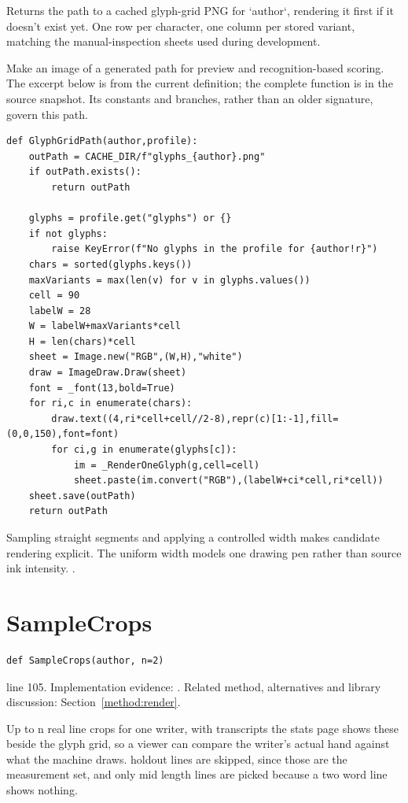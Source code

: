 Returns the path to a cached glyph-grid PNG for `author`, rendering it first if it doesn't exist yet. One row per character, one column per stored variant, matching the manual-inspection sheets used during development.


Make an image of a generated path for preview and recognition-based scoring. The excerpt below is from the current definition; the complete function is in the source snapshot. Its constants and branches, rather than an older signature, govern this path.


\begin{lstlisting}[style=plain]
def GlyphGridPath(author,profile):
    outPath = CACHE_DIR/f"glyphs_{author}.png"
    if outPath.exists():
        return outPath

    glyphs = profile.get("glyphs") or {}
    if not glyphs:
        raise KeyError(f"No glyphs in the profile for {author!r}")
    chars = sorted(glyphs.keys())
    maxVariants = max(len(v) for v in glyphs.values())
    cell = 90
    labelW = 28
    W = labelW+maxVariants*cell
    H = len(chars)*cell
    sheet = Image.new("RGB",(W,H),"white")
    draw = ImageDraw.Draw(sheet)
    font = _font(13,bold=True)
    for ri,c in enumerate(chars):
        draw.text((4,ri*cell+cell//2-8),repr(c)[1:-1],fill=(0,0,150),font=font)
        for ci,g in enumerate(glyphs[c]):
            im = _RenderOneGlyph(g,cell=cell)
            sheet.paste(im.convert("RGB"),(labelW+ci*cell,ri*cell))
    sheet.save(outPath)
    return outPath
\end{lstlisting}
Sampling straight segments and applying a controlled width makes candidate rendering explicit. The uniform width models one drawing pen rather than source ink intensity. \cite{pillowdraw,opencvdraw,code2026}.


\section{SampleCrops}\label{fn:web-render:SampleCrops}
\begin{lstlisting}[style=sig]
def SampleCrops(author, n=2)
\end{lstlisting}
 line 105. Implementation evidence: \cite{code2026}. Related method, alternatives and library discussion: Section~\ref{method:render}.


Up to n real line crops for one writer, with transcripts the stats page shows these beside the glyph grid, so a viewer can compare the writer's actual hand against what the machine draws. holdout lines are skipped, since those are the measurement set, and only mid length lines are picked because a two word line shows nothing.


